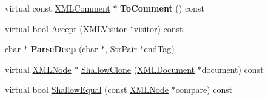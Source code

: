 \begin{DoxyCompactItemize}
\mbox{\label{classtinyxml2_1_1XMLComment_a8e60caf06d8e88876a94b81db026b85c}} 
virtual const \hyperlink{classtinyxml2_1_1XMLComment}{X\+M\+L\+Comment} $\ast$ {\bfseries To\+Comment} () const
\item 
virtual bool \hyperlink{classtinyxml2_1_1XMLComment_a4a33dc32fae0285b03f9cfcb3e43e122}{Accept} (\hyperlink{classtinyxml2_1_1XMLVisitor}{X\+M\+L\+Visitor} $\ast$visitor) const
\item 
\mbox{\label{classtinyxml2_1_1XMLComment_ae3abf65920d9c86e8f90c4a239783b05}} 
char $\ast$ {\bfseries Parse\+Deep} (char $\ast$, \hyperlink{classtinyxml2_1_1StrPair}{Str\+Pair} $\ast$end\+Tag)
\item 
virtual \hyperlink{classtinyxml2_1_1XMLNode}{X\+M\+L\+Node} $\ast$ \hyperlink{classtinyxml2_1_1XMLComment_a08991cc63fadf7e95078ac4f9ea1b073}{Shallow\+Clone} (\hyperlink{classtinyxml2_1_1XMLDocument}{X\+M\+L\+Document} $\ast$document) const
\item 
virtual bool \hyperlink{classtinyxml2_1_1XMLComment_a6f7d227b25afa8cc3c763b7cc8833739}{Shallow\+Equal} (const \hyperlink{classtinyxml2_1_1XMLNode}{X\+M\+L\+Node} $\ast$compare) const
\end{DoxyCompactItemize}
